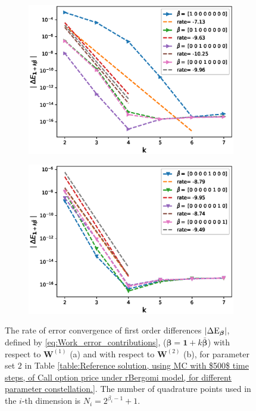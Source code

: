 \begin{figure}[h!]
	\centering
	\begin{subfigure}{.4\textwidth}
		\centering
		\includegraphics[width=1\linewidth]{./figures/rBergomi_mixed_error_rates/without_change_measure/N_4/H_002/first_difference_rbergomi_4steps_H_002_K_1_totally_hierarch_with_rate_W1}
		\caption{}
		\label{fig:sub3}
	\end{subfigure}%
	\begin{subfigure}{.4\textwidth}
		\centering
		\includegraphics[width=1\linewidth]{./figures/rBergomi_mixed_error_rates/without_change_measure/N_4/H_002/first_difference_rbergomi_4steps_H_002_K_1_totally_hierarch_with_rate_W2}
		\caption{}
		\label{fig:sub4}
	\end{subfigure}
	
	
	
	\caption{The rate of error convergence of first order differences $\left\lvert\Delta \text{E}_{\boldsymbol{\beta}}\right\rvert$, defined by \eqref{eq:Work_error_contributions}, ($\boldsymbol{\beta}=\mathbf{1}+k \bar{\boldsymbol{\beta}}$) with respect to $\mathbf{W}^{(1)}$ (a)  and  with respect to $\mathbf{W}^{(2)}$ (b), for parameter set $2$ in Table \ref{table:Reference solution, using MC with $500$ time steps, of Call option price under rBergomi model, for different parameter constellation.}. The number of quadrature points used in the $i$-th dimension is $N_i=2^{\beta_i-1}+1$. }
	\label{fig:first_diff_comp_K_1_H_002}
\end{figure}


